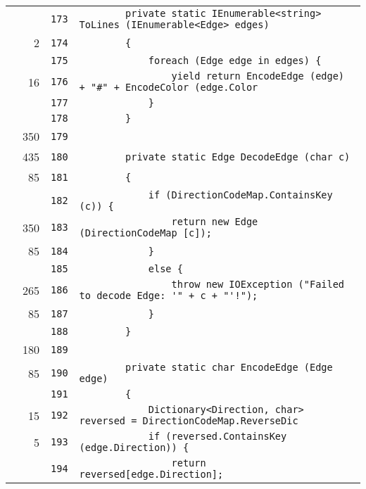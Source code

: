 \documentclass[a4paper,10pt]{article}
\begin{document}
\begin{longtable}[l]{lrrl}
\cellcolor{gray} &  & \verb~173~ & \verb~        private static IEnumerable<string> ToLines (IEnumerable<Edge> edges)~\\
\cellcolor{green} & 2 & \verb~174~ & \verb~        {~\\
\cellcolor{gray} &  & \verb~175~ & \verb~            foreach (Edge edge in edges) {~\\
\cellcolor{green} & 16 & \verb~176~ & \verb~                yield return EncodeEdge (edge) + "#" + EncodeColor (edge.Color~\\
\cellcolor{gray} &  & \verb~177~ & \verb~            }~\\
\cellcolor{gray} &  & \verb~178~ & \verb~        }~\\
\cellcolor{green} & 350 & \verb~179~ & \verb~~\\
\cellcolor{green} & 435 & \verb~180~ & \verb~        private static Edge DecodeEdge (char c)~\\
\cellcolor{green} & 85 & \verb~181~ & \verb~        {~\\
\cellcolor{gray} &  & \verb~182~ & \verb~            if (DirectionCodeMap.ContainsKey (c)) {~\\
\cellcolor{green} & 350 & \verb~183~ & \verb~                return new Edge (DirectionCodeMap [c]);~\\
\cellcolor{green} & 85 & \verb~184~ & \verb~            }~\\
\cellcolor{gray} &  & \verb~185~ & \verb~            else {~\\
\cellcolor{green} & 265 & \verb~186~ & \verb~                throw new IOException ("Failed to decode Edge: '" + c + "'!");~\\
\cellcolor{green} & 85 & \verb~187~ & \verb~            }~\\
\cellcolor{gray} &  & \verb~188~ & \verb~        }~\\
\cellcolor{green} & 180 & \verb~189~ & \verb~~\\
\cellcolor{green} & 85 & \verb~190~ & \verb~        private static char EncodeEdge (Edge edge)~\\
\cellcolor{gray} &  & \verb~191~ & \verb~        {~\\
\cellcolor{green} & 15 & \verb~192~ & \verb~            Dictionary<Direction, char> reversed = DirectionCodeMap.ReverseDic~\\
\cellcolor{green} & 5 & \verb~193~ & \verb~            if (reversed.ContainsKey (edge.Direction)) {~\\
\cellcolor{gray} &  & \verb~194~ & \verb~                return reversed[edge.Direction];~\\

\end{longtable}
\end{document}
